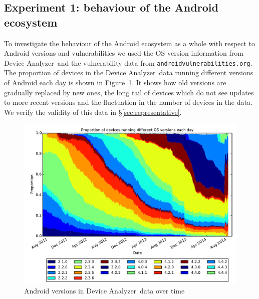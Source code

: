 \documentclass[conference,a4paper,twoside]{IEEEtran}
\newcommand{\da}{Device Analyzer}
\newcommand{\avo}{\texttt{androidvulnerabilities.org}}
\begin{document}
\subsection{Experiment 1: behaviour of the Android ecosystem}\label{sec:exp:android_ecosystem}
To investigate the behaviour of the Android ecosystem as a whole with respect to Android versions and vulnerabilities we used the OS version information from \da\ and the vulnerability data from \avo.
The proportion of devices in the \da\ data running different versions of Android each day is shown in Figure~\ref{fig:norm_os}.
It shows how old versions are gradually replaced by new ones, the long tail of devices which do not see updates to more recent versions and the fluctuation in the number of devices in the data.
We verify the validity of this data in \S\ref{sec:representative}.
\begin{figure}
 \centering
 \includegraphics[width=\columnwidth]{figures/da_norm_os}
 \caption{Android versions in \da\ data over time}
 \label{fig:norm_os}
\end{figure}
\end{document}
